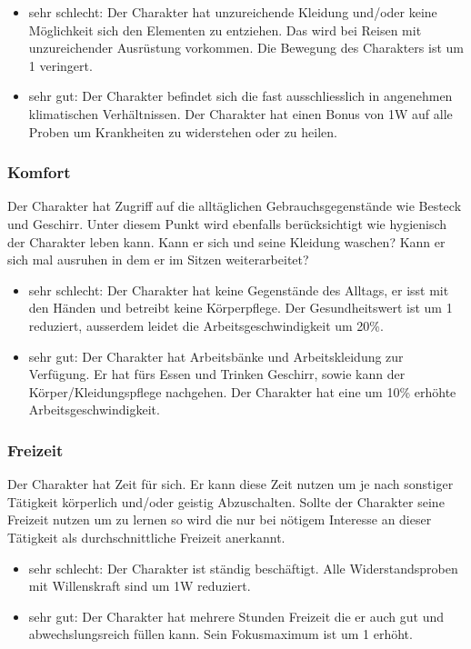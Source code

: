 \documentclass{article}
\begin{document}
\begin{itemize}
\item sehr schlecht: Der Charakter hat unzureichende Kleidung und/oder keine Möglichkeit sich den Elementen zu entziehen. Das wird bei Reisen mit unzureichender Ausrüstung vorkommen. Die Bewegung des Charakters ist um 1 veringert.
\item sehr gut: Der Charakter befindet sich die fast ausschliesslich in angenehmen klimatischen Verhältnissen. Der Charakter hat einen Bonus von 1W auf alle Proben um Krankheiten zu widerstehen oder zu heilen.
\end{itemize}

\subsubsection{Komfort}

Der Charakter hat Zugriff auf die alltäglichen Gebrauchsgegenstände wie Besteck und Geschirr. Unter diesem Punkt
wird ebenfalls berücksichtigt wie hygienisch der Charakter leben kann. Kann er sich und seine Kleidung waschen? Kann
er sich mal ausruhen in dem er im Sitzen weiterarbeitet?

\begin{itemize}
\item sehr schlecht: Der Charakter hat keine Gegenstände des Alltags, er isst mit den Händen und betreibt keine Körperpflege. Der Gesundheitswert ist um 1 reduziert, ausserdem leidet die Arbeitsgeschwindigkeit um 20\%.
\item sehr gut: Der Charakter hat Arbeitsbänke und Arbeitskleidung zur Verfügung. Er hat fürs Essen und Trinken Geschirr, sowie kann der Körper/Kleidungspflege nachgehen. Der Charakter hat eine um 10\% erhöhte Arbeitsgeschwindigkeit.
\end{itemize}

\subsubsection{Freizeit}

Der Charakter hat Zeit für sich. Er kann diese Zeit nutzen um je nach sonstiger Tätigkeit körperlich und/oder geistig
Abzuschalten. Sollte der Charakter seine Freizeit nutzen um zu lernen so wird die nur bei nötigem Interesse an dieser
Tätigkeit als durchschnittliche Freizeit anerkannt.

\begin{itemize}
\item sehr schlecht: Der Charakter ist ständig beschäftigt. Alle Widerstandsproben mit Willenskraft sind um 1W reduziert.
\item sehr gut: Der Charakter hat mehrere Stunden Freizeit die er auch gut und abwechslungsreich füllen kann. Sein Fokusmaximum ist um 1 erhöht.
\end{itemize}
\end{document}
